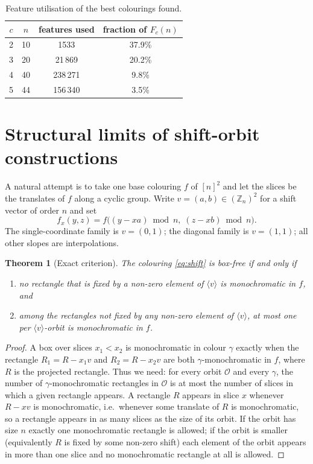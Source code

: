 \documentclass[11pt]{article}
\newtheorem{theorem}{Theorem}
\theoremstyle{definition}
\begin{document}
\begin{table}[h]
\centering
\begin{tabular}{cccc}
\toprule
$c$ & $n$ & features used & fraction of $F_c(n)$ \\
\midrule
2 & 10 & 1533 & 37.9\% \\
3 & 20 & 21\,869 & 20.2\% \\
4 & 40 & 238\,271 & 9.8\% \\
5 & 44 & 156\,340 & 3.5\% \\
\bottomrule
\end{tabular}
\caption{Feature utilisation of the best colourings found.}
\label{tab:features}
\end{table}

\section{Structural limits of shift-orbit constructions}\label{sec:shift}

A natural attempt is to take one base colouring $f$ of $[n]^2$ and let the slices be the
translates of $f$ along a cyclic group. Write $v=(a,b)\in(\mathbb{Z}_n)^2$ for a shift
vector of order $n$ and set
\begin{equation}\label{eq:shift}
f_x(y,z)=f\big((y-xa)\bmod n,\;(z-xb)\bmod n\big).
\end{equation}
The single-coordinate family is $v=(0,1)$; the diagonal family is $v=(1,1)$; all other
slopes are interpolations.

\begin{theorem}[Exact criterion]\label{thm:criterion}
The colouring \eqref{eq:shift} is box-free if and only if
\begin{enumerate}[label=(\alph*)]
\item no rectangle that is fixed by a non-zero element of $\langle v\rangle$ is
  monochromatic in $f$, and
\item among the rectangles not fixed by any non-zero element of $\langle v\rangle$, at
  most one per $\langle v\rangle$-orbit is monochromatic in $f$.
\end{enumerate}
\end{theorem}

\begin{proof}
A box over slices $x_1<x_2$ is monochromatic in colour $\gamma$ exactly when the
rectangle $R_1=R-x_1v$ and $R_2=R-x_2v$ are both $\gamma$-monochromatic in $f$, where
$R$ is the projected rectangle. Thus we need: for every orbit $\mathcal{O}$ and every
$\gamma$, the number of $\gamma$-monochromatic rectangles in $\mathcal{O}$ is at most
the number of slices in which a given rectangle appears. A rectangle $R$ appears in
slice $x$ whenever $R-xv$ is monochromatic, i.e.\ whenever some translate of $R$ is
monochromatic, so a rectangle appears in as many slices as the size of its orbit. If the
orbit has size $n$ exactly one monochromatic rectangle is allowed; if the orbit is
smaller (equivalently $R$ is fixed by some non-zero shift) each element of the orbit
appears in more than one slice and no monochromatic rectangle at all is allowed.
\end{proof}
\end{document}

